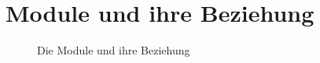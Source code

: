 \chapter{Module und ihre Beziehung}
\begin{figure}[htb]
 \centering
 \caption{\label{modules}Die Module und ihre Beziehung}
\end{figure}
